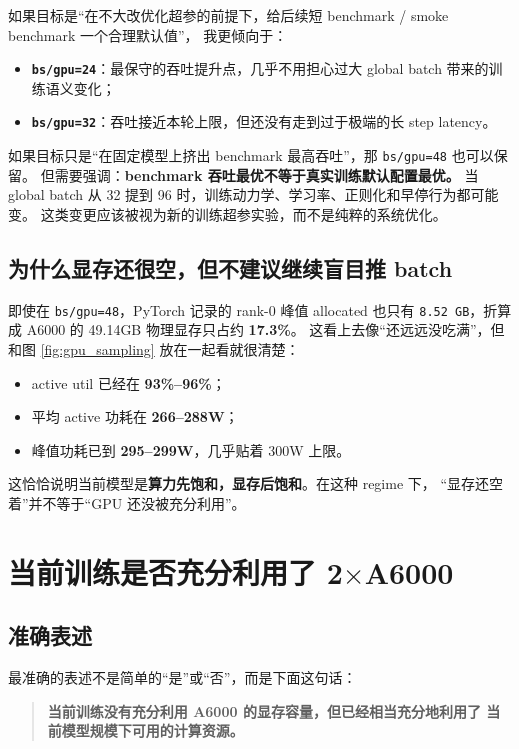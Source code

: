 \documentclass[11pt,a4paper]{ctexart}
\begin{document}
如果目标是“在不大改优化超参的前提下，给后续短 benchmark / smoke benchmark 一个合理默认值”，
我更倾向于：
\begin{itemize}[leftmargin=2em]
  \item \textbf{\texttt{bs/gpu=24}}：最保守的吞吐提升点，几乎不用担心过大 global batch 带来的训练语义变化；
  \item \textbf{\texttt{bs/gpu=32}}：吞吐接近本轮上限，但还没有走到过于极端的长 step latency。
\end{itemize}

如果目标只是“在固定模型上挤出 benchmark 最高吞吐”，那 \texttt{bs/gpu=48} 也可以保留。
但需要强调：\textbf{benchmark 吞吐最优不等于真实训练默认配置最优。}
当 global batch 从 32 提到 96 时，训练动力学、学习率、正则化和早停行为都可能变。
这类变更应该被视为新的训练超参实验，而不是纯粹的系统优化。

\subsection{为什么显存还很空，但不建议继续盲目推 batch}

即使在 \texttt{bs/gpu=48}，PyTorch 记录的 rank-0 峰值 allocated 也只有
\texttt{8.52 GB}，折算成 A6000 的 49.14GB 物理显存只占约 \textbf{17.3\%}。
这看上去像“还远远没吃满”，但和图 \ref{fig:gpu_sampling} 放在一起看就很清楚：
\begin{itemize}[leftmargin=2em]
  \item active util 已经在 \textbf{93\%--96\%}；
  \item 平均 active 功耗在 \textbf{266--288W}；
  \item 峰值功耗已到 \textbf{295--299W}，几乎贴着 300W 上限。
\end{itemize}

这恰恰说明当前模型是\textbf{算力先饱和，显存后饱和}。在这种 regime 下，
“显存还空着”并不等于“GPU 还没被充分利用”。

\section{当前训练是否充分利用了 2$\times$A6000}

\subsection{准确表述}

最准确的表述不是简单的“是”或“否”，而是下面这句话：

\begin{quote}
\textbf{当前训练没有充分利用 A6000 的显存容量，但已经相当充分地利用了
当前模型规模下可用的计算资源。}
\end{quote}
\end{document}

